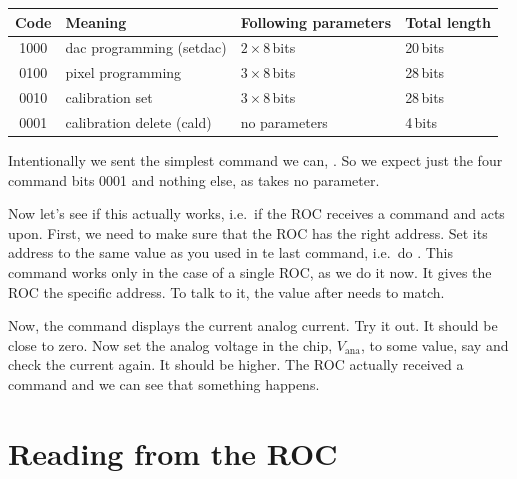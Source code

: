 \bigskip

\begin{tabular}{clll}
    \toprule
    Code & Meaning & Following parameters & Total length \\
    \midrule
    1000 & dac programming (setdac)    & $2\times8$\,bits & 20\,bits \\
    0100 & pixel programming           & $3\times8$\,bits & 28\,bits \\
    0010 & calibration set             & $3\times8$\,bits & 28\,bits \\
    0001 & calibration delete (cald) & no parameters & 4\,bits \\
    \bottomrule
\end{tabular}

\bigskip

Intentionally we sent the simplest command we can, . So we expect just the four command bits 0001 and nothing else, as  takes no parameter.

Now let's see if this actually works, i.e.~if the ROC receives a command and acts upon. First, we need to make sure that the ROC has the right address. Set its address to the same value as you used in te last  command, i.e.~do . This command works only in the case of a single ROC, as we do it now. It gives the ROC the specific address. To talk to it, the value after  needs to match.

Now, the command  displays the current analog current. Try it out. It should be close to zero. Now set the analog voltage in the chip, $V_\text{ana}$, to some value, say  and check the current again. It should be higher. The ROC actually received a command and we can see that something happens.

\section{Reading from the ROC}

\bigskip

